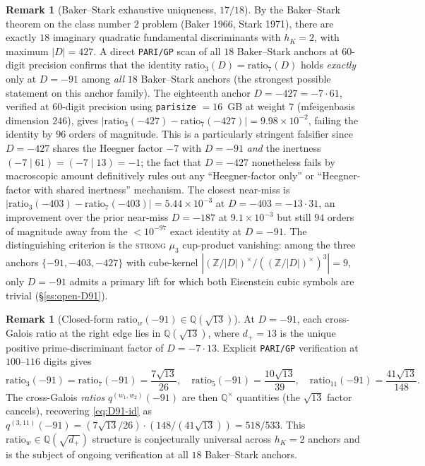 \documentclass[11pt,a4paper]{amsart}
\theoremstyle{plain}
\theoremstyle{definition}
\newtheorem{remark}[theorem]{Remark}
\newcommand{\Q}{\mathbb{Q}}
\newcommand{\Z}{\mathbb{Z}}
\newcommand{\qstr}[2]{q^{(#1,#2)}}
\begin{document}
\begin{remark}[Baker--Stark exhaustive uniqueness, $17/18$]\label{rem:D91-uniqueness-exhaustive}
By the Baker--Stark theorem on the class number $2$ problem (Baker 1966,
Stark 1971), there are exactly $18$ imaginary quadratic fundamental
discriminants with $h_K = 2$, with maximum $|D| = 427$. A direct
\texttt{PARI/GP} scan of all $18$ Baker--Stark anchors at $60$-digit
precision confirms that the identity
$\mathrm{ratio}_3(D) = \mathrm{ratio}_7(D)$ holds \emph{exactly} only at
$D = -91$ among \emph{all} $18$ Baker--Stark anchors (the strongest
possible statement on this anchor family). The eighteenth anchor
$D = -427 = -7 \cdot 61$, verified at $60$-digit precision using
\texttt{parisize} $= 16$~GB at weight $7$ (mfeigenbasis dimension
$246$), gives $|\mathrm{ratio}_3(-427) - \mathrm{ratio}_7(-427)|
= 9.98 \times 10^{-2}$, failing the identity by $96$ orders of magnitude.
This is a particularly stringent falsifier since $D = -427$ shares the
Heegner factor $-7$ with $D = -91$ \emph{and} the inertness
$(-7\mid 61) = (-7\mid 13) = -1$; the fact that $D = -427$ nonetheless
fails by macroscopic amount definitively rules out any
``Heegner-factor only'' or ``Heegner-factor with shared inertness''
mechanism. The closest near-miss is
$|\mathrm{ratio}_3(-403) - \mathrm{ratio}_7(-403)| = 5.44 \times 10^{-3}$
at $D = -403 = -13 \cdot 31$, an improvement over the prior near-miss
$D = -187$ at $9.1 \times 10^{-3}$ but still $94$ orders of magnitude
away from the $< 10^{-97}$ exact identity at $D = -91$. The
distinguishing criterion is the \textsc{strong} $\mu_3$ cup-product
vanishing: among the three anchors $\{-91, -403, -427\}$ with
cube-kernel $|(\Z/|D|)^\times/((\Z/|D|)^\times)^3| = 9$, only $D = -91$
admits a primary lift for which both Eisenstein cubic symbols are
trivial (\S\ref{ss:open-D91}).
\end{remark}

\begin{remark}[Closed-form $\mathrm{ratio}_w(-91) \in \Q(\sqrt{13})$]\label{rem:D91-closed-form}
At $D = -91$, each cross-Galois ratio at the right edge lies in
$\Q(\sqrt{13})$, where $d_+ = 13$ is the unique positive prime-discriminant
factor of $D = -7 \cdot 13$. Explicit \texttt{PARI/GP} verification at
$100$--$116$ digits gives
\begin{equation}\label{eq:D91-closed-form}
\mathrm{ratio}_3(-91) = \mathrm{ratio}_7(-91) = \frac{7\sqrt{13}}{26},
\quad
\mathrm{ratio}_5(-91) = \frac{10\sqrt{13}}{39},
\quad
\mathrm{ratio}_{11}(-91) = \frac{41\sqrt{13}}{148}.
\end{equation}
The cross-Galois \emph{ratios} $\qstr{w_1}{w_2}(-91)$ are then $\Q^\times$
quantities (the $\sqrt{13}$ factor cancels), recovering
\eqref{eq:D91-id} as
$\qstr{3}{11}(-91) = (7\sqrt{13}/26) \cdot (148 / (41 \sqrt{13})) = 518/533$.
This $\mathrm{ratio}_w \in \Q(\sqrt{d_+})$ structure is conjecturally
universal across $h_K = 2$ anchors and is the subject of ongoing
verification at all $18$ Baker--Stark anchors.
\end{remark}
\end{document}
